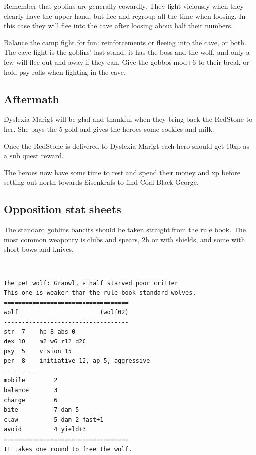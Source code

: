 Remember that goblins are generally cowardly. They fight viciously when they clearly have the upper hand, but flee and regroup all the time when loosing. In this case they will flee into the cave after loosing about half their numbers.

Balance the camp fight for fun: reinforcements or fleeing into the cave, or both. The cave fight is the goblins' last stand, it has the boss and the wolf, and only a few will flee out and away if they can. Give the gobbos mod+6 to their break-or-hold psy rolls when fighting in the cave.


\subsection*{Aftermath}
Dyslexia Marigt will be glad and thankful when they bring back the RedStone to her. She pays the 5 gold and gives the heroes some cookies and milk.

Once the RedStone is delivered to Dyslexia Marigt each hero should get 10xp as a sub quest reward.

The heroes now have some time to rest and spend their money and xp before setting out north towards Eisenkrafs to find Coal Black George.


\subsection*{Opposition stat sheets}

\raggedbottom

The standard goblins bandits should be taken straight from the rule book.
The most common weaponry is clubs and spears, 2h or with shields, and some with short bows and knives.

\

\goodbreak \begin{samepage} \vsmall \begin{verbatim}
The pet wolf: Graowl, a half starved poor critter
This one is weaker than the rule book standard wolves.
===================================
wolf                       (wolf02)
-----------------------------------
str  7    hp 8 abs 0
dex 10    m2 w6 r12 d20
psy  5    vision 15
per  8    initiative 12, ap 5, aggressive
----------
mobile        2
balance       3
charge        6
bite          7 dam 5
claw          5 dam 2 fast+1
avoid         4 yield+3
===================================
It takes one round to free the wolf.
\end{verbatim} \normalsize \end{samepage}

